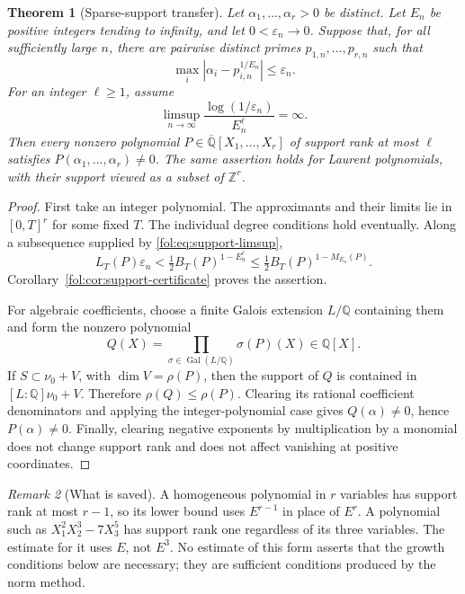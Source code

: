 \documentclass[11pt,a4paper]{article}
\newtheorem{theorem}{Theorem}[section]
\theoremstyle{definition}
\theoremstyle{remark}
\newtheorem{remark}[theorem]{Remark}
\numberwithin{equation}{section}
\begin{document}
\begin{theorem}[Sparse-support transfer]
\label{fol:thm:sparse-transfer}
Let $\alpha_1,\ldots,\alpha_r>0$ be distinct. Let $E_n$ be positive
integers tending to infinity, and let $0<\varepsilon_n\to0$. Suppose
that, for all sufficiently large $n$, there are pairwise distinct primes
$p_{1,n},\ldots,p_{r,n}$ such that
\[
 \max_i|\alpha_i-p_{i,n}^{1/E_n}|\le\varepsilon_n.
\]
For an integer $\ell\ge1$, assume
\begin{equation}\label{fol:eq:support-limsup}
 \limsup_{n\to\infty}\frac{\log(1/\varepsilon_n)}{E_n^\ell}=\infty.
\end{equation}
Then every nonzero polynomial
$P\in\overline{\mathbb Q}[X_1,\ldots,X_r]$ of support rank at most
$\ell$ satisfies $P(\alpha_1,\ldots,\alpha_r)\ne0$.
The same assertion holds for Laurent polynomials, with their support
viewed as a subset of $\mathbb Z^r$.
\end{theorem}

\begin{proof}
First take an integer polynomial. The approximants and their limits
lie in $[0,T]^r$ for some fixed $T$. The individual degree conditions
hold eventually. Along a subsequence supplied by
\eqref{fol:eq:support-limsup},
\[
 L_T(P)\varepsilon_n
 <\tfrac12 B_T(P)^{1-E_n^\ell}
 \le\tfrac12 B_T(P)^{1-M_{E_n}(P)}.
\]
Corollary~\ref{fol:cor:support-certificate} proves the assertion.

For algebraic coefficients, choose a finite Galois extension $L/\mathbb Q$
containing them and form the nonzero polynomial
\[
 Q(X)=\prod_{\sigma\in\operatorname{Gal}(L/\mathbb Q)}\sigma(P)(X)
       \in\mathbb Q[X].
\]
If $S\subset\nu_0+V$, with $\dim V=\rho(P)$, then the support of $Q$
is contained in $[L:\mathbb Q]\nu_0+V$. Therefore $\rho(Q)\le\rho(P)$.
Clearing its rational coefficient denominators and applying the
integer-polynomial case gives $Q(\alpha)\ne0$, hence $P(\alpha)\ne0$.
Finally, clearing negative exponents by multiplication by a monomial
does not change support rank and does not affect vanishing at positive
coordinates.
\end{proof}

\begin{remark}[What is saved]
A homogeneous polynomial in $r$ variables has support rank at most
$r-1$, so its lower bound uses $E^{r-1}$ in place of $E^r$. A polynomial
such as $X_1^2X_2^3-7X_3^5$ has support rank one regardless of its three
variables. The estimate for it uses $E$, not $E^3$.
No estimate of this form asserts that the growth conditions below are
necessary; they are sufficient conditions produced by the norm method.
\end{remark}
\end{document}
